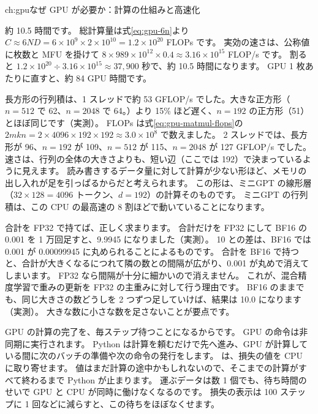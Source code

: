 \begin{answers}{ch:gpu}{なぜ GPU が必要か：計算の仕組みと高速化}
\item 約 10.5 時間です。
総計算量は式\eqref{eq:gpu-6n}より $C\approx6ND=6\times10^{9}\times2\times10^{10}=1.2\times10^{20}$ FLOPs です。
実効の速さは、公称値に枚数と MFU を掛けて $8\times989\times10^{12}\times0.4\approx3.16\times10^{15}$ FLOP/s です。
割ると $1.2\times10^{20}\div3.16\times10^{15}\approx37{,}900$ 秒で、約 10.5 時間になります。
GPU 1 枚あたりに直すと、約 84 GPU 時間です。
\item 長方形の行列積は、1 スレッドで約 53 GFLOP/s でした。大きな正方形（$n=512$ で 62、$n=2048$ で 64。）より 15\% ほど遅く、$n=192$ の正方形（51）とほぼ同じです（実測）。
FLOPs は式\eqref{eq:gpu-matmul-flops}の $2mkn=2\times4096\times192\times192\approx3.0\times10^{8}$ で数えました。
2 スレッドでは、長方形が 96、$n=192$ が 109、$n=512$ が 115、$n=2048$ が 127 GFLOP/s でした。
速さは、行列の全体の大きさよりも、短い辺（ここでは 192）で決まっているように見えます。
読み書きするデータ量に対して計算が少ない形ほど、メモリの出し入れが足を引っぱるからだと考えられます。
この形は、ミニGPT の線形層（$32\times128=4096$ トークン、$d=192$）の計算そのものです。
ミニGPT の行列積は、この CPU の最高速の 8 割ほどで動いていることになります。
\item 合計を FP32 で持てば、正しく求まります。
合計だけを FP32 にして BF16 の 0.001 を 1 万回足すと、9.9945 になりました（実測）。
10 との差は、BF16 では 0.001 が 0.00099945 に丸められることによるものです。
合計を BF16 で持つと、合計が大きくなるにつれて隣の数との間隔が広がり、0.001 が丸めで消えてしまいます。
FP32 なら間隔が十分に細かいので消えません。
これが、混合精度学習で重みの更新を FP32 の主重みに対して行う理由です。
BF16 のままでも、同じ大きさの数どうしを 2 つずつ足していけば、結果は 10.0 になります（実測）。
大きな数に小さな数を足さないことが要点です。
\item GPU の計算の完了を、毎ステップ待つことになるからです。
GPU の命令は非同期に実行されます。
Python は計算を頼むだけで先へ進み、GPU が計算している間に次のバッチの準備や次の命令の発行をします。
 は、損失の値を CPU に取り寄せます。
値はまだ計算の途中かもしれないので、そこまでの計算がすべて終わるまで Python が止まります。
運ぶデータは数 1 個でも、待ち時間のせいで GPU と CPU が同時に働けなくなるのです。
損失の表示は 100 ステップに 1 回などに減らすと、この待ちをほぼなくせます。
\end{answers}
